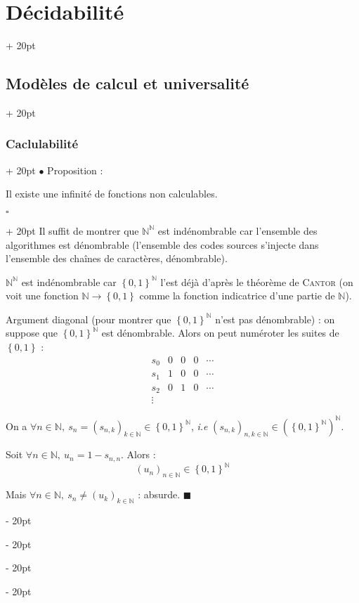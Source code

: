 \documentclass[a4paper, 12pt, twoside]{article}
\newcommand{\N}{\mathbb{N}} %
\newcommand{\lr}[1]{\left( #1 \right)}
\newcommand{\set}[1]{\left\{ #1 \right\}}
\newcommand{\ind}[1][20pt]{\advance\leftskip + #1}
\newcommand{\deind}[1][20pt]{\advance\leftskip - #1}
\newenvironment{indt}[2][20pt]{#2 \par \ind[#1]}{\par \deind} %
\newenvironment{proof}[1][{}]{\begin{indt}{$\square$ #1}}{$\blacksquare$ \end{indt}}
\begin{document}
\begin{indt}{\section{Décidabilité}}
\begin{indt}{\subsection{Modèles de calcul et universalité}}
\begin{indt}{\subsubsection{Caclulabilité}}
                $\bullet$ Proposition :

                \begin{emphBox}
                    Il existe une infinité de fonctions non calculables.
                \end{emphBox}

                \vspace{6pt}
                
                \begin{proof}
                    Il suffit de montrer que $\N^\N$ est indénombrable car l'ensemble des algorithmes est dénombrable (l'ensemble des codes sources s'injecte dans l'ensemble des chaînes de caractères, dénombrable).

                    $\N^\N$ est indénombrable car $\set{0, 1}^\N$ l'est déjà d'après le théorème de \textsc{Cantor} (on voit une fonction $\N \longrightarrow \set{0, 1}$ comme la fonction indicatrice d'une partie de $\N$).

                    \vspace{12pt}
                    
                    Argument diagonal (pour montrer que $\set{0, 1}^\N$ n'est pas dénombrable) : on suppose que $\set{0, 1}^\N$ est dénombrable. Alors on peut numéroter les suites de $\set{0, 1}$ :
                    \[
                        \begin{array}{ccccc}
                            s_0 & 0 & 0 & 0 & \cdots
                            \\
                            s_1 & 1 & 0 & 0 & \cdots
                            \\
                            s_2 & 0 & 1 & 0 & \cdots
                            \\
                            \vdots
                        \end{array}
                    \]

                    On a $\forall n \in \N,\ s_n = \lr{s_{n, k}}_{k \in \N} \in \set{0, 1}^\N$, \textit{i.e} $\lr{s_{n, k}}_{n, k \in \N} \in \lr{\set{0, 1}^\N}^\N$.

                    Soit $\forall n \in \N,\ u_n = 1 - s_{n, n}$. Alors :
                    \[
                        \lr{u_n}_{n \in \N} \in \set{0, 1}^\N
                    \]

                    Mais $\forall n \in \N,\ s_n \neq \lr{u_k}_{k \in \N}$ : absurde.
                \end{proof}
            \end{indt}


\end{indt}
\end{indt}
\end{document}
